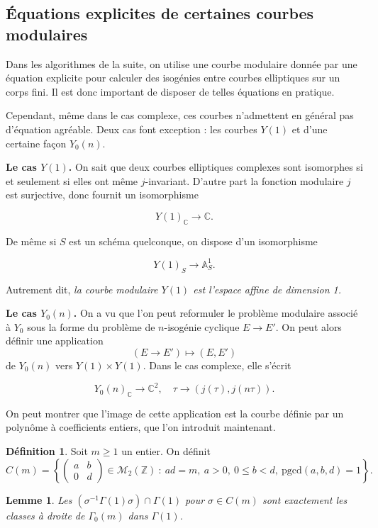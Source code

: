 \documentclass[11pt,a4paper]{article}
\newcommand{\Z}{\mathbb{Z}}
\newcommand{\C}{\mathbb{C}}
\newcommand{\A}{\mathbb{A}}
\newcommand{\M}{\mathcal{M}}
\newcommand{\vers}{\rightarrow}
\newtheorem*{lem}{Lemme}
\theoremstyle{definition}
\newtheorem*{defi}{Définition}
\begin{document}
\newpage

\subsection{\'Equations explicites de certaines courbes modulaires}


Dans les algorithmes de la suite, on utilise une courbe modulaire donnée par une équation explicite pour calculer des isogénies entre courbes elliptiques sur un corps fini. Il est donc important de disposer de telles équations en pratique.

Cependant, même dans le cas complexe, ces courbes n'admettent en général pas d'équation agréable. Deux cas font exception : les courbes $Y(1)$ et d'une certaine façon $Y_0(n)$.

\textbf{Le cas $Y(1)$.} On sait que deux courbes elliptiques complexes sont isomorphes si et seulement si elles ont même $j$-invariant. D'autre part la fonction modulaire $j$ est surjective, donc fournit un isomorphisme

$$Y(1)_\C\vers \C.$$

De même si $S$ est un schéma quelconque, on dispose d'un isomorphisme

$$Y(1)_S\vers \A^1_S .$$

Autrement dit, \emph{la courbe modulaire $Y(1)$ est l'espace affine de dimension 1.}


\textbf{Le cas $Y_0(n)$.} On a vu que l'on peut reformuler le problème modulaire associé à $Y_0$ sous la forme du problème de $n$-isogénie cyclique $E\vers E'$. On peut alors définir une application
$$(E\vers E') \longmapsto (E, E')$$
de $Y_0(n)$ vers $Y(1)\times Y(1)$. Dans le cas complexe, elle s'écrit

$$Y_0(n)_\C \vers \C^2,\quad \tau\vers (j(\tau), j(n\tau)).$$

On peut montrer que l'image de cette application est la courbe définie par un polynôme à coefficients entiers, que l'on introduit maintenant.


\begin{defi}
Soit $m\geq 1$ un entier. On définit
$$C(m)=\left\{ 
\left(
\begin{matrix}
a & b \\
0 & d 
\end{matrix}
\right)
\in \M_2(\Z)\ :\ ad=m,\ a>0,\ 0\leq b<d,\ \mathrm{pgcd}(a,b,d)=1\right\}.$$
\end{defi}

\begin{lem}
Les $(\sigma^{-1}\Gamma(1)\sigma)\cap \Gamma(1)$ pour $\sigma\in C(m)$ sont exactement les classes à droite de $\Gamma_0(m)$ dans $\Gamma(1)$.
\end{lem}
\end{document}
